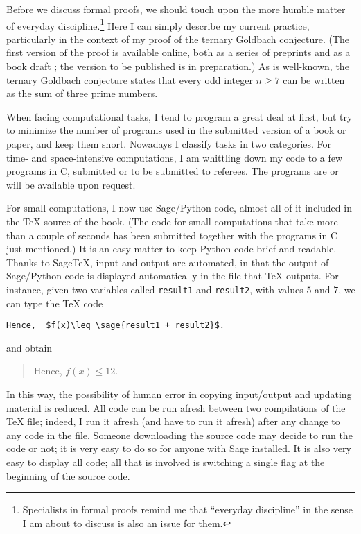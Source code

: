 Before we discuss formal proofs, we should touch upon the more humble matter
of everyday discipline.\footnote{Specialists in formal proofs remind me that
  ``everyday discipline'' in the sense I am about to discuss is also an issue
  for them.}
Here I can simply describe my current practice,
particularly in the context of my proof of the ternary Goldbach
conjecture. (The first version of the proof is available online, both
as a series of preprints and as a book draft \cite{Helfbook}; the
version to be published is in preparation.) As is well-known,
the ternary Goldbach conjecture states that every odd integer $n\geq 7$ can
be written as the sum of three prime numbers.


When facing computational tasks, I tend to program a great deal at first, but
try to minimize the number of programs used in the submitted version of
a book or paper, and keep them short. Nowadays I classify tasks in two
categories. For time- and
space-intensive computations, I am whittling down my code to a few programs
in C, submitted or to be submitted to referees. The programs are or will be
available upon request. 

For small computations, I now use Sage/Python code, almost all of it
included in the TeX source of the book. (The code for small computations that
take more than a couple of seconds has been submitted together with the programs
in C just mentioned.) It is an easy matter to keep Python
code brief and readable. Thanks to SageTeX, input and output are automated,
in that the output of Sage/Python code is displayed automatically in the 
file that TeX outputs. For instance, given two variables called \texttt{result1}
and \texttt{result2}, with values $5$ and $7$, we can type the TeX code
\begin{verbatim}
Hence,  $f(x)\leq \sage{result1 + result2}$.
\end{verbatim}
and obtain
\begin{quote}
  Hence, $f(x)\leq 12$.
\end{quote}
In this way, the possibility of human error in copying input/output and
updating material is reduced. All code can be run afresh between two
compilations of the TeX file; indeed, I run it afresh (and have to run it
afresh) after any change to any code in the file. Someone downloading the
source code may decide to run the code or not; it is very easy to do so
for anyone with Sage installed. It is also very easy to display all code;
all that is involved is switching
a single flag at the beginning of the source code.

